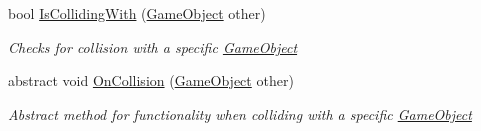 \begin{DoxyCompactItemize}
bool \hyperlink{class_mage_twinstick_1_1_game_object_a024097f67b0a8b2f38451e8df05b6b1d}{Is\+Colliding\+With} (\hyperlink{class_mage_twinstick_1_1_game_object}{Game\+Object} other)
\begin{DoxyCompactList}\small\item\em Checks for collision with a specific \hyperlink{class_mage_twinstick_1_1_game_object}{Game\+Object} \end{DoxyCompactList}\item 
abstract void \hyperlink{class_mage_twinstick_1_1_game_object_a60f894a5ff911af7bfe3e4bd8abf253f}{On\+Collision} (\hyperlink{class_mage_twinstick_1_1_game_object}{Game\+Object} other)
\begin{DoxyCompactList}\small\item\em Abstract method for functionality when colliding with a specific \hyperlink{class_mage_twinstick_1_1_game_object}{Game\+Object} \end{DoxyCompactList}\end{DoxyCompactItemize}
